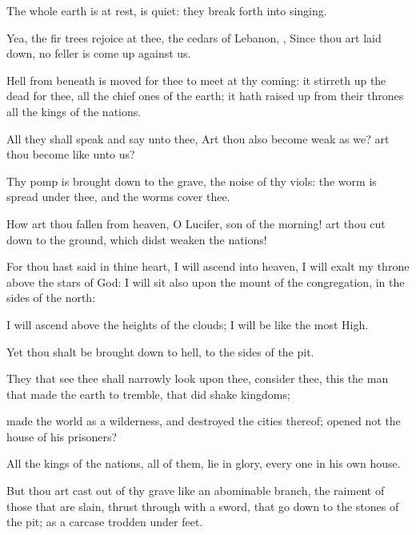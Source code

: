{The whole
earth is at
rest,
{} is
quiet: they break
forth into
singing.

Yea, the fir
trees
rejoice at thee,
{} the
cedars of
Lebanon,
{}, Since thou art laid
down, no
feller is come
up against us.

Hell from beneath is
moved for thee to
meet
{} at thy
coming: it stirreth
up the
dead for thee,
{} all the chief
ones of the
earth; it hath raised
up from their
thrones all the
kings of the
nations.

All they shall
speak and
say unto thee, Art thou also become
weak as we? art thou become
like unto us?

Thy
pomp is brought
down to the
grave,
{} the
noise of thy
viols: the
worm is
spread under thee, and the
worms
cover thee.

How art thou
fallen from
heaven, O
Lucifer,
son of the
morning!
{} art thou cut
down to the
ground, which didst
weaken the
nations!

For thou hast
said in thine
heart, I will
ascend into
heaven, I will
exalt my
throne
above the
stars of
God: I will
sit also upon the
mount of the
congregation, in the
sides of the
north:

I will
ascend above the
heights of the
clouds; I will be
like the most
High.

Yet thou shalt be brought
down to
hell, to the
sides of the
pit.

They that
see thee shall narrowly
look upon thee,
{}
consider thee,
{} this the
man that made the
earth to
tremble, that did
shake
kingdoms;

made the
world as a
wilderness, and
destroyed the
cities thereof;
{}
opened not the
house of his
prisoners?

All the
kings of the
nations,
{} all of them,
lie in
glory, every
one in his own
house.

But thou art cast
out of thy
grave like an
abominable
branch,
{} the
raiment of those that are
slain, thrust
through with a
sword, that go
down to the
stones of the
pit; as a
carcase trodden under
feet.

}
